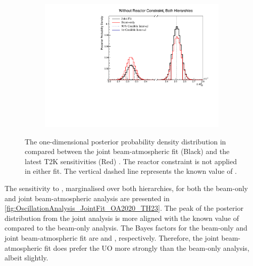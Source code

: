 \begin{figure}[h]
  \begin{subfigure}[t]{0.98\textwidth}
    \includegraphics[width=\textwidth, trim={0mm 0mm 0mm 0mm}, clip,page=1]{Figures/OA/JointFit_OA2020_Comp/ContourComparison_1D_dm32_BH_2_woRC_UnSmeared_CredibleInterval.pdf}
  \end{subfigure}
  \caption{The one-dimensional posterior probability density distribution in  compared between the joint beam-atmospheric fit (Black) and the latest T2K sensitivities (Red) \cite{Dunne2020-uf, t2k_tn_393}. The reactor constraint is not applied in either fit. The vertical dashed line represents the known value of .}
  \label{fig:OscillationAnalysis_JointFit_OA2020_DM32}
\end{figure}

The sensitivity to , marginalised over both hierarchies, for both the beam-only and joint beam-atmospheric analysis are presented in \autoref{fig:OscillationAnalysis_JointFit_OA2020_TH23}. The peak of the posterior distribution from the joint analysis is more aligned with the known value of  compared to the beam-only analysis.
The Bayes factors for the beam-only and joint beam-atmospheric fit are  and , respectively. Therefore, the joint beam-atmospheric fit does prefer the UO more strongly than the beam-only analysis, albeit slightly.


